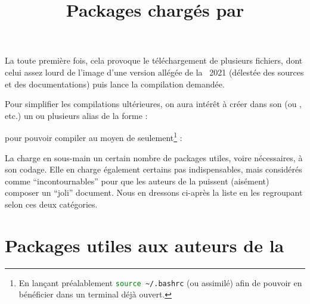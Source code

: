 \documentclass{letgut}
\begin{document}
La toute première fois, cela provoque le téléchargement de plusieurs fichiers,
dont celui assez lourd de l'image d'une version allégée de la \tl{}~2021
(délestée des sources et des documentations) puis lance la compilation
demandée.

Pour simplifier les compilations ultérieures, on aura intérêt à créer dans son
 (ou , etc.) un ou plusieurs alias de la forme :


pour pouvoir compiler au moyen de seulement\footnote{En lançant préalablement
  \lstinline[language=bash]+source ~/.bashrc+ (ou assimilé) afin de pouvoir en
  bénéficier dans un terminal déjà ouvert.} :


\title{Packages chargés par }
\label{sec:packages-charges-par}

La  charge en sous-main un certain nombre de packages utiles, voire
nécessaires, à son codage. Elle en charge également certains pas indispensables,
mais considérés comme \enquote{incontournables} pour que les auteurs de la
 puissent (aisément) composer un \enquote{joli} document. Nous en
dressons ci-après la liste en les regroupant selon ces deux catégories.

\section{Packages utiles aux auteurs de la }
\label{sec:utiles-aux-auteurs}
\end{document}
